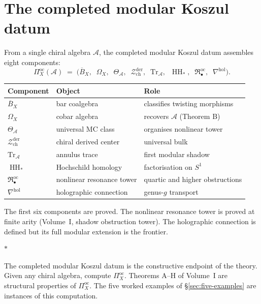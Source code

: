 \documentclass[11pt]{article}
\newcommand{\cA}{\mathcal{A}}
\newcommand{\cZ}{\mathcal{Z}}
\newcommand{\barB}{\overline{B}}
\newcommand{\HH}{\operatorname{HH}}
\newcommand{\Zder}{\cZ^{\mathrm{der}}_{\mathrm{ch}}}
\newcommand{\sep}{\bigskip\begin{center}$*$\end{center}\medskip}
\begin{document}
\section{The completed modular Koszul datum}
\label{sec:platonic}

From a single chiral algebra $\cA$, the completed modular Koszul datum
assembles eight components:
\[
\Pi^{\mathrm{oc}}_X(\cA)
\;=\;
\bigl(\barB_X,\;\; \Omega_X,\;\; \Theta_\cA,\;\;
\Zder,\;\; \mathrm{Tr}_\cA,\;\;
\HH_*,\;\; \mathfrak{R}^{\mathrm{oc}}_\bullet,\;\;
\nabla^{\mathrm{hol}}\bigr).
\]

\begin{center}
\small
\renewcommand{\arraystretch}{1.15}
\begin{tabular}{@{}lll@{}}
\textbf{Component} & \textbf{Object} & \textbf{Role} \\
\hline
$\barB_X$ & bar coalgebra & classifies twisting morphisms \\[3pt]
$\Omega_X$ & cobar algebra & recovers $\cA$ (Theorem B) \\[3pt]
$\Theta_\cA$ & universal MC class & organises nonlinear tower \\[3pt]
$\Zder$ & chiral derived center & universal bulk \\[3pt]
$\mathrm{Tr}_\cA$ & annulus trace
  & first modular shadow \\[3pt]
$\HH_*$ & Hochschild homology & factorisation on $S^1$ \\[3pt]
$\mathfrak{R}^{\mathrm{oc}}_\bullet$ & nonlinear resonance tower
  & quartic and higher obstructions \\[3pt]
$\nabla^{\mathrm{hol}}$ & holographic connection
  & genus-$g$ transport
\end{tabular}
\end{center}

\medskip

The first six components are proved.  The nonlinear resonance
tower is proved at finite arity (Volume~I, shadow obstruction tower).
The holographic connection is defined but its full modular
extension is the frontier.

\sep

The completed modular Koszul datum is the constructive endpoint of the
theory.  Given any chiral algebra, compute $\Pi^{\mathrm{oc}}_X$.
Theorems A--H of Volume~I are structural properties of
$\Pi^{\mathrm{oc}}_X$.  The five worked examples of
\S\ref{sec:five-examples} are instances of this computation.
\end{document}
